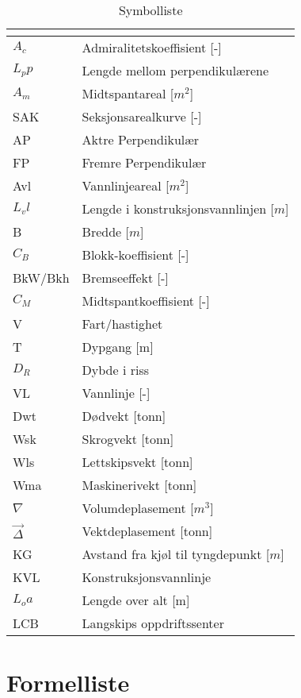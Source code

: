 \documentclass[norsk]{article}
\begin{document}
\begin{table}[h!]
    \caption{Symbolliste}
    \label{tab:table1}
    \begin{tabular}{l|l} 
      \textbf{} & \textbf{}\\
      \hline
      $A_c$ & Admiralitetskoeffisient [-]\\
      $L_pp$ & Lengde mellom perpendikulærene\\ 
      $A_m$ & Midtspantareal [$m^2$]\\
      SAK & Seksjonsarealkurve [-]\\
      AP & Aktre Perpendikulær\\ 
      FP & Fremre Perpendikulær \\
      Avl & Vannlinjeareal [$m^2$] \\ 
      $L_vl$ &  Lengde i konstruksjonsvannlinjen [$m$]\\
      B & Bredde [$m$]\\ 
      $C_B$ & Blokk-koeffisient [-]\\
      BkW/Bkh & Bremseeffekt [-] \\
      $C_M$ & Midtspantkoeffisient [-] \\
      V & Fart/hastighet \\
      T & Dypgang  [m]\\
      $D_R$ & Dybde i riss\\
      VL & Vannlinje [-]\\
      Dwt & Dødvekt [tonn]\\
      Wsk & Skrogvekt [tonn]\\
      Wls & Lettskipsvekt [tonn]\\
      Wma & Maskinerivekt [tonn]\\
      $\nabla$ & Volumdeplasement [$m^3$]\\ 
      $\vec{\Delta}$ & Vektdeplasement [tonn]\\
      KG & Avstand fra kjøl til tyngdepunkt  [$m$]\\ 
      KVL & Konstruksjonsvannlinje\\
      $L_oa$ & Lengde over alt [m]\\
      LCB & Langskips oppdriftssenter\\
    \end{tabular}
\end{table}

\newpage

\section{Formelliste}
 
\end{document}
